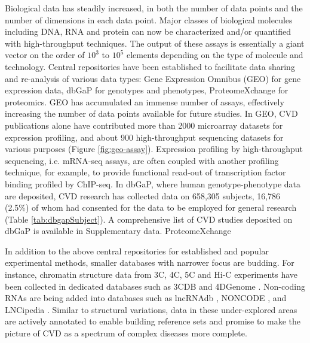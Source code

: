 \documentclass[letter]{bioinfo}
\begin{document}
	Biological data has steadily increased, in both the number of data points and the number of dimensions in each data point.
	Major classes of biological molecules including DNA, RNA and protein can now be characterized and/or quantified with high-throughput techniques. The output of these assays is essentially a giant vector on the order of $10^3$ to $10^5$ elements depending on the type of molecule and technology.
	Central repositories have been established to facilitate data sharing and re-analysis of various data types: Gene Expression Omnibus (GEO) \citep{Barrett:2013:NCBI} for gene expression data, dbGaP \citep{Tryka:2014:dbGaP} for genotypes and phenotypes, ProteomeXchange \citep{Vizcaino:2014:ProteomeXchange,Deutsch:2017:ProteomeXchange} for proteomics.
	GEO has accumulated an immense number of assays, effectively increasing the number of data points available for future studies.
	In GEO, CVD publications alone have contributed more than 2000 microarray datasets for expression profiling, and about 900 high-throughput sequencing datasets for various purposes (Figure \ref{fig:geo-assay}). Expression profiling by high-throughput sequencing, i.e. mRNA-seq assays, are often coupled with another profiling technique, for example, to provide functional read-out of transcription factor binding profiled by ChIP-seq.
	In dbGaP, where human genotype-phenotype data are deposited, CVD research has collected data on 658,305 subjects, 16,786 (2.5\%) of whom had consented for the data to be employed for general research (Table \ref{tab:dbgapSubject}). A comprehensive list of CVD studies deposited on dbGaP is available in Supplementary data.
	ProteomeXchange
	
	In addition to the above central repositories for established and popular experimental methods, smaller databases with narrower focus are budding. For instance, chromatin structure data from 3C, 4C, 5C and Hi-C experiments have been collected in dedicated databases such as 3CDB \citep{Yun:2016:3CDB} and 4DGenome \citep{Teng:2015:4DGenome}. Non-coding RNAs are being added into databases such as lncRNAdb \citep{Quek:2015:lncRNAdb}, NONCODE \citep{Fang:2018:NONCODEV5}, and LNCipedia \citep{Volders:2018:LNCipedia}.  Similar to structural variations, data in these under-explored areas are actively annotated to enable building reference sets and promise to make the picture of CVD as a spectrum of complex diseases more complete.
\end{document}
